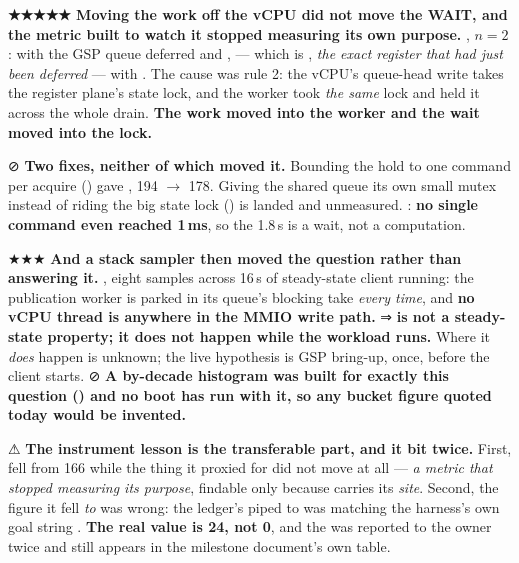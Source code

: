 \documentclass[10.5pt]{article}
\begin{document}
\begin{warnbox}\small
\textbf{★★★★★ Moving the work off the vCPU did not move the WAIT, and the metric built to watch
it stopped measuring its own purpose.} \measured{} , $n=2$: with the GSP queue
deferred and , \textbf{} --- which is , \emph{the exact register that had
just been deferred} --- with . The cause was rule 2: the
vCPU's queue-head write takes the register plane's state lock, and the worker took \emph{the
same} lock and held it across the whole drain. \textbf{The work moved into the worker and the
wait moved into the lock.}

\smallskip
⊘ \textbf{Two fixes, neither of which moved it.} Bounding the hold to one command per acquire
() gave ,  194 $\to$ 178. Giving the
shared queue its own small mutex instead of riding the big state lock () is landed and
unmeasured. \measured{} : \textbf{no single command even reached 1\,ms}, so the 1.8\,s
is a wait, not a computation.

\smallskip
★★★ \textbf{And a stack sampler then moved the question rather than answering it.} \measured{}
, eight samples across 16\,s of steady-state client running: the publication worker is
parked in its queue's blocking take \emph{every time}, and \textbf{no vCPU thread is anywhere in
the MMIO write path.} ⇒ \textbf{ is not a steady-state property; it
does not happen while the workload runs.} Where it \emph{does} happen is unknown; the live
hypothesis is GSP bring-up, once, before the client starts. ⊘ \textbf{A by-decade histogram was
built for exactly this question () and no boot has run with it, so any bucket figure
quoted today would be invented.}

\smallskip
⚠ \textbf{The instrument lesson is the transferable part, and it bit twice.} First,
 fell from 166 while the thing it proxied for did not move at all ---
\emph{a metric that stopped measuring its purpose}, findable only because 
carries its \emph{site}. Second, the figure it fell \emph{to} was wrong: the ledger's
 piped to  was matching the harness's own
goal string . \textbf{The real value is 24, not 0}, and the
 was reported to the owner twice and still appears in the milestone document's own table.


\end{warnbox}
\end{document}
